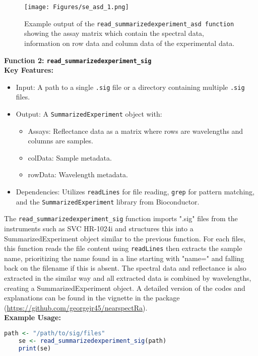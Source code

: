 \documentclass[12pt,a4paper]{report}
\begin{document}
\begin{figure}[h]
    \centering
    \texttt{[image: Figures/se\_asd\_1.png]}
    \caption{Example output of the \texttt{read\_summarizedexperiment\_asd function} showing the assay matrix which contain the spectral data, information on row data and column data of the experimental data.}
    \label{Figure 2}
\end{figure}


\textbf{Function 2: \texttt{read\_summarizedexperiment\_sig}} \\

\textbf{Key Features:}
\begin{itemize}
    \item Input: A path to a single \texttt{.sig} file or a directory containing multiple \texttt{.sig} files.
    \item Output: A \texttt{SummarizedExperiment} object with:
    \begin{itemize}
        \item Assays: Reflectance data as a matrix where rows are wavelengths and columns are samples.
        \item colData: Sample metadata.
        \item rowData: Wavelength metadata.
    \end{itemize}
    \item Dependencies: Utilizes \texttt{readLines} for file reading, \texttt{grep} for pattern matching, and the \texttt{SummarizedExperiment} library from Bioconductor.
\end{itemize}


The \texttt{read\_summarizedexperiment\_sig} function imports ".sig" files from the instruments such as SVC HR-1024i and structures this into a SummarizedExperiment object similar to the previous function. For each files, this function reads the file content using \texttt{readLines} then extracts the sample name, prioritizing the name found in a line starting with "name=" and falling back on the filename if this is absent. The spectral data and reflectance is also extracted in the similar way and all extracted data is combined by wavelengths, creating a SummarizedExperiment object. A detailed version of the codes and explanations can be found in the vignette in the package (\url{https://github.com/georgejr45/nearspectRa}). \\



\textbf{Example Usage:}

\begin{lstlisting}[language=R, style=mystyle]
    path <- "/path/to/sig/files"
    se <- read_summarizedexperiment_sig(path)
    print(se)
\end{lstlisting}
\end{document}
